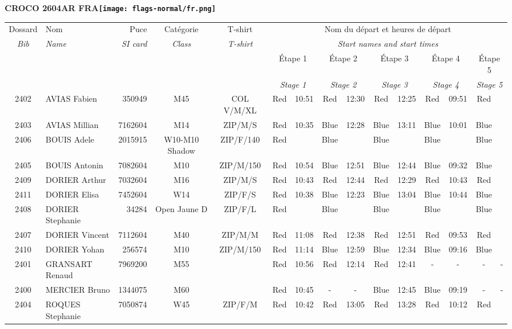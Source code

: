 \documentclass{report}
\begin{document}
\newpage
  \Huge \centering \bfseries CROCO 2604AR FRA\normalfont \footnotesize \sffamily \hfill \texttt{[image: flags-normal/fr.png]} \newline 
  \begin{longtable}{|c|l|r|c|c|*{5}{cc|}}
    Dossard & Nom  & Puce    & Catégorie & T-shirt & \multicolumn{10}{c|}{Nom du départ et heures de départ} \\
    \itshape Bib     & \itshape Name & \itshape SI card & \itshape Class  & \itshape  T-shirt  & \multicolumn{10}{c|}{\itshape Start names and start times} \\
    \hline
    & & & & & \multicolumn{2}{c|}{Étape 1} & \multicolumn{2}{c|}{Étape 2} & \multicolumn{2}{c|}{Étape 3} & \multicolumn{2}{c|}{Étape 4} & \multicolumn{2}{c|}{Étape 5} \\
    & & & & & \multicolumn{2}{c|}{\itshape Stage 1} & \multicolumn{2}{c|}{\itshape Stage 2} & \multicolumn{2}{c|}{\itshape Stage 3} & \multicolumn{2}{c|}{\itshape Stage 4} & \multicolumn{2}{c|}{\itshape Stage 5} \\
    \hline
    2402 & AVIAS Fabien & 350949 & M45 & COL V/M/XL & Red & 10:51 & Red & 12:30 & Red & 12:25 & Red & 09:51 & Red &  \\
    2403 & AVIAS Millian & 7162604 & M14 & ZIP/M/S & Red & 10:35 & Blue & 12:28 & Blue & 13:11 & Blue & 10:01 & Blue &  \\
    2406 & BOUIS Adele & 2015915 & W10-M10 Shadow & ZIP/F/140 & Red &   & Blue &   & Blue &   & Blue &   & Blue &  \\
    2405 & BOUIS Antonin & 7082604 & M10 & ZIP/M/150 & Red & 10:54 & Blue & 12:51 & Blue & 12:44 & Blue & 09:32 & Blue &  \\
    2409 & DORIER Arthur & 7032604 & M16 & ZIP/M/S & Red & 10:43 & Red & 12:44 & Red & 12:29 & Red & 10:43 & Red &  \\
    2411 & DORIER Elisa & 7452604 & W14 & ZIP/F/S & Red & 10:38 & Blue & 12:23 & Blue & 13:04 & Blue & 10:44 & Blue &  \\
    2408 & DORIER Stephanie & 34284 & Open Jaune D & ZIP/F/L & Red &   & Blue &   & Blue &   & Blue &   & Blue &  \\
    2407 & DORIER Vincent & 7112604 & M40 & ZIP/M/M & Red & 11:08 & Red & 12:38 & Red & 12:51 & Red & 09:53 & Red &  \\
    2410 & DORIER Yohan & 256574 & M10 & ZIP/M/150 & Red & 11:14 & Blue & 12:59 & Blue & 12:34 & Blue & 09:16 & Blue &  \\
    2401 & GRANSART Renaud & 7969200 & M55 &   & Red & 10:56 & Red & 12:14 & Red & 12:41 & - &  - & - &  -\\
    2400 & MERCIER Bruno & 1344075 & M60 &   & Red & 10:45 & - &  - & Blue & 12:45 & Blue & 09:19 & - &  -\\
    2404 & ROQUES Stephanie & 7050874 & W45 & ZIP/F/M & Red & 10:42 & Red & 13:05 & Red & 13:28 & Red & 10:12 & Red &  \\
  \end{longtable}
\end{document}
